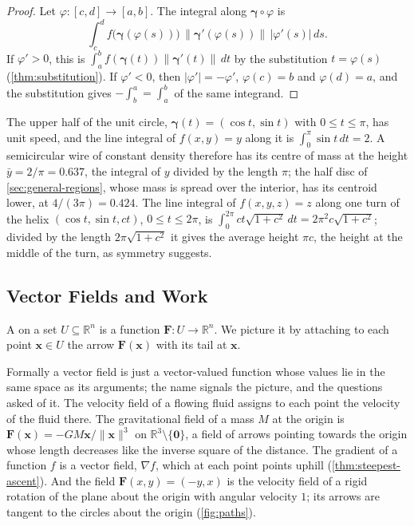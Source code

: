 \begin{proof}
Let $\varphi\colon[c,d]\to[a,b]$. The integral along $\boldsymbol\gamma\circ\varphi$ is
\[
\int_c^df\bigl(\boldsymbol\gamma(\varphi(s))\bigr)\,\bigl\|\boldsymbol\gamma'(\varphi(s))\bigr\|\,|\varphi'(s)|\,ds .
\] If $\varphi'>0$, this is $\int_a^bf(\boldsymbol\gamma(t))\|\boldsymbol\gamma'(t)\|\,dt$ by the substitution $t=\varphi(s)$ (\cref{thm:substitution}). If $\varphi'<0$, then $|\varphi'|=-\varphi'$, $\varphi(c)=b$ and $\varphi(d)=a$, and the substitution gives $-\int_b^a=\int_a^b$ of the same integrand.
\end{proof}

The upper half of the unit circle, $\boldsymbol\gamma(t)=(\cos t,\sin t)$ with $0\le t\le\pi$, has unit speed, and the line integral of $f(x,y)=y$ along it is $\int_0^\pi\sin t\,dt=2$. A semicircular wire of constant density therefore has its centre of mass at the height $\bar y=2/\pi=0.637$, the integral of $y$ divided by the length $\pi$; the half disc of \cref{sec:general-regions}, whose mass is spread over the interior, has its centroid lower, at $4/(3\pi)=0.424$. The line integral of $f(x,y,z)=z$ along one turn of the helix $(\cos t,\sin t,ct)$, $0\le t\le2\pi$, is $\int_0^{2\pi}ct\sqrt{1+c^2}\,dt=2\pi^2c\sqrt{1+c^2}$; divided by the length $2\pi\sqrt{1+c^2}$ it gives the average height $\pi c$, the height at the middle of the turn, as symmetry suggests.

\subsection{Vector Fields and Work}

\begin{definition}
\label{def:vector-field}
A  on a set $U\subseteq\mathbb R^n$ is a function $\mathbf F\colon U\to\mathbb R^n$. We picture it by attaching to each point $\mathbf x\in U$ the arrow $\mathbf F(\mathbf x)$ with its tail at $\mathbf x$.
\end{definition}

Formally a vector field is just a vector-valued function whose values lie in the same space as its arguments; the name signals the picture, and the questions asked of it. The velocity field of a flowing fluid assigns to each point the velocity of the fluid there. The gravitational field of a mass $M$ at the origin is $\mathbf F(\mathbf x)=-GM\mathbf x/\|\mathbf x\|^3$ on $\mathbb R^3\setminus\{\mathbf0\}$, a field of arrows pointing towards the origin whose length decreases like the inverse square of the distance. The gradient of a function $f$ is a vector field, $\nabla f$, which at each point points uphill (\cref{thm:steepest-ascent}). And the field $\mathbf F(x,y)=(-y,x)$ is the velocity field of a rigid rotation of the plane about the origin with angular velocity $1$; its arrows are tangent to the circles about the origin (\cref{fig:paths}).

